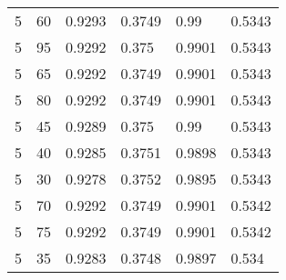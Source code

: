 \begin{center}
\begin{longtable}{|l|l|l|l|l|l|}
5  & 60 & 0.9293 & 0.3749 & 0.99   & 0.5343 \\
5  & 95 & 0.9292 & 0.375  & 0.9901 & 0.5343 \\
5  & 65 & 0.9292 & 0.3749 & 0.9901 & 0.5343 \\
5  & 80 & 0.9292 & 0.3749 & 0.9901 & 0.5343 \\
5  & 45 & 0.9289 & 0.375  & 0.99   & 0.5343 \\
5  & 40 & 0.9285 & 0.3751 & 0.9898 & 0.5343 \\
5  & 30 & 0.9278 & 0.3752 & 0.9895 & 0.5343 \\
5  & 70 & 0.9292 & 0.3749 & 0.9901 & 0.5342 \\
5  & 75 & 0.9292 & 0.3749 & 0.9901 & 0.5342 \\
5  & 35 & 0.9283 & 0.3748 & 0.9897 & 0.534
\end{longtable}

\end{center}